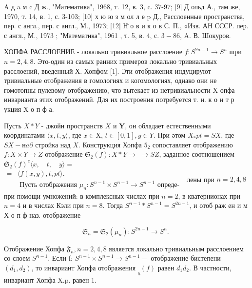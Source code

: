 \documentclass[10pt]{article}
\begin{document}
A д a м c Д ж., "Математика", 1968, т. 12, в. 3, c. 37-97; [9] Д ольд А., там же, 1970, т. 14, в. 1, с. 3-103; [10] х ю ю з м ол л е p Д., Расслоенные пространства, пер. с англ., пер. с англ., М., 1973; [12] Н̈ о в и к о в С. П., «Изв. АН СССР. пер. с англ., М., 1973 ; "Математика", 1961 , т. 5, в. 4, с. $3-86$, A. В. Шокуров.



ХОПФА РАССЛОЕНИЕ - локально тривиальное расслоение $f: S^{2 n-1} \longrightarrow S^{n}$ шри $n=2,4,8$. Это-один из самых ранних примеров локально тривиальных расслоений, введенный Х. Хопфом [1]. Эти отображения индуцируют тривиальные отображения в гомологиях и когомологиях, однако они не гомотопны пулевому отображению, что вытекает из нетривиальности X опфа инварианта этих отображений. Для их построения потребуется т. н. к о н т р укция $\mathrm{X}$ о п ф а.



Пусть $X * Y$ - джойн пространств $X$ и $\boldsymbol{Y}$, он обладает естественными координатами $\langle x, t, y\rangle$, где $x \in \mathrm{X}$, $t \in[0,1], y \in Y$. При әтом $X_{*} p t=S X$, где $S X-н a \partial$ стройка над $X$. Конструкция Хопфа $5_{2}$ сопоставляет отображению $f: X \times Y \rightarrow Z$ отображение $\mathfrak{S}_{2}(f): X * Y \rightarrow$ $\longrightarrow S Z$, заданное соотношением $\mathfrak{S}_{2}(f)^{e}\langle x, \quad t, \quad y\rangle=$ $\begin{aligned}= & \langle f(x, y), t, p t\rangle . \\ & \text { Пусть отображения } \mu_{n}: S^{n-1} \times S^{n-1} \rightarrow S^{n-1} \text { опреде- }\end{aligned}$ лены при $n=2,4,8$ при помощи умножений: в комплексных числах при $n=2$, в кватернионах при $n=4$ и в числах Кэли при $n=8$. Тогда $S^{n-1} * S^{n-1}=S^{2 n-1}$, и отоб раж ен и м Х о п ф наз. отображение



\[

\mathfrak{S}_{n}=\mathfrak{S}_{2}\left(\mu_{n}\right): S^{2 n-1} \rightarrow S^{n} \text {. }

\]



Отображение Хопфа $\mathfrak{F}_{n}, n=2,4,8$ является локально тривиальным расслоением со слоем $S^{n-1}$. Если f: $S^{n-1} \times S^{n-1} \longrightarrow S^{n-1}-$ отображение бистепени $\left(d_{1}, d_{2}\right)$, то инвариант Хопфа отображения $\underset{5}{ }(f)$ равен $d_{1} d_{2}$. В частности, инвариант Хопфа X.p. равен 1.
\end{document}
